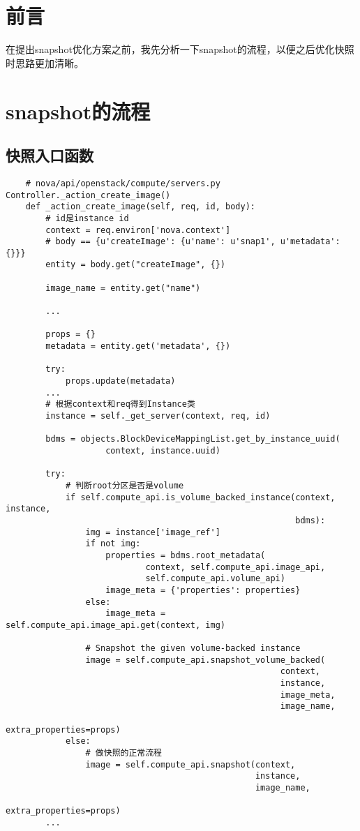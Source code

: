 \documentclass[a4paper,left=1.5cm,right=1.5cm,11pt]{article}
\begin{document}
\tableofcontents

\clearpage

\section{前言}
    在提出snapshot优化方案之前，我先分析一下snapshot的流程，以便之后优化快照时思路更加清晰。

\section{snapshot的流程}

\subsection{快照入口函数}
    \begin{lstlisting}
    # nova/api/openstack/compute/servers.py Controller._action_create_image()
    def _action_create_image(self, req, id, body):
        # id是instance id
        context = req.environ['nova.context']
        # body == {u'createImage': {u'name': u'snap1', u'metadata': {}}}
        entity = body.get("createImage", {})

        image_name = entity.get("name")

        ...

        props = {}
        metadata = entity.get('metadata', {})
        
        try:
            props.update(metadata)
        ...
        # 根据context和req得到Instance类
        instance = self._get_server(context, req, id)

        bdms = objects.BlockDeviceMappingList.get_by_instance_uuid(
                    context, instance.uuid)

        try:
            # 判断root分区是否是volume
            if self.compute_api.is_volume_backed_instance(context, instance,
                                                          bdms):
                img = instance['image_ref']
                if not img:
                    properties = bdms.root_metadata(
                            context, self.compute_api.image_api,
                            self.compute_api.volume_api)
                    image_meta = {'properties': properties}
                else:
                    image_meta = self.compute_api.image_api.get(context, img)
                
                # Snapshot the given volume-backed instance
                image = self.compute_api.snapshot_volume_backed(
                                                       context,
                                                       instance,
                                                       image_meta,
                                                       image_name,
                                                       extra_properties=props)
            else:
                # 做快照的正常流程
                image = self.compute_api.snapshot(context,
                                                  instance,
                                                  image_name,
                                                  extra_properties=props)
        ...


\end{lstlisting}
\end{document}
